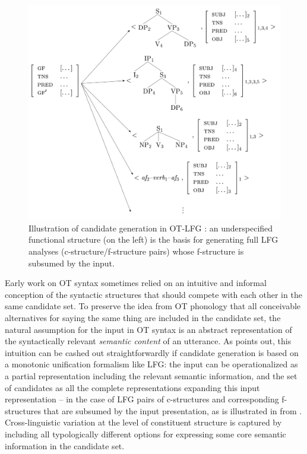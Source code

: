 \documentclass[output=paper,hidelinks]{langscibook}
\begin{document}
\begin{figure}[ht]
    \centering
    \includegraphics[scale=.45]{figures/OT/OT-candidate-generation.pdf}
\caption{Illustration of candidate generation in OT-LFG \citep{Bresnan-Explaining-Morphosyntactic}: an underspecified functional structure (on the left) is the basis for generating full LFG analyses (c-structure/f-structure pairs) whose f-structure is subsumed by the input.}
\label{fig:OT-LFG-Gen}
\end{figure}


Early work on OT syntax sometimes %
relied on an intuitive and informal conception of the syntactic structures that should compete with each other in the same candidate set.
To preserve the idea from OT phonology that all conceivable alternatives for saying the same thing are included in the candidate set, the natural assumption for the input in OT syntax is an abstract representation of the syntactically relevant \emph{semantic content} of an utterance. As \citet{Bresnan-96-LFG-conference} points out, this intuition can be cashed out straightforwardly if candidate generation is based on a monotonic unification formalism like LFG: the input can be operationalized as a partial representation including the relevant semantic information, and the set of candidates as all the complete representations expanding this input representation -- in the case of LFG pairs of c-structures and corresponding f-structures that are subsumed by the input presentation, as is illustrated in  from \citet[]{Bresnan-Explaining-Morphosyntactic}. Cross-linguistic variation at the level of constituent structure is captured by including all typologically different options for expressing some core semantic information in the candidate set. 
\end{document}
